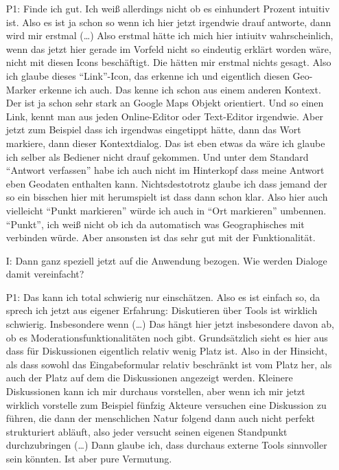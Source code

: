 \begin{itemize}
    \item[P1:] Finde ich gut. Ich wei{\ss} allerdings nicht ob es einhundert Prozent intuitiv ist. Also es ist ja schon so wenn ich hier jetzt irgendwie drauf antworte, dann wird mir erstmal (\dots) Also erstmal h{\"a}tte ich mich hier intiuitv wahrscheinlich, wenn das jetzt hier gerade im Vorfeld nicht so eindeutig erkl{\"a}rt worden w{\"a}re, nicht mit diesen Icons besch{\"a}ftigt. Die h{\"a}tten mir erstmal nichts gesagt. Also ich glaube dieses "`Link"'-Icon, das erkenne ich und eigentlich diesen Geo-Marker erkenne ich auch. Das kenne ich schon aus einem anderen Kontext. Der ist ja schon sehr stark an Google Maps Objekt orientiert. Und so einen Link, kennt man aus jeden Online-Editor oder Text-Editor irgendwie. Aber jetzt zum Beispiel dass ich irgendwas eingetippt h{\"a}tte, dann das Wort markiere, dann dieser Kontextdialog. Das ist eben etwas da w{\"a}re ich glaube ich selber als Bediener nicht drauf gekommen. Und unter dem Standard "`Antwort verfassen"' habe ich auch nicht im Hinterkopf dass meine Antwort eben Geodaten enthalten kann. Nichtsdestotrotz glaube ich dass jemand der so ein bisschen hier mit herumspielt ist dass dann schon klar. Also hier auch vielleicht "`Punkt markieren"' w{\"u}rde ich auch in "`Ort markieren"' umbennen. "`Punkt"', ich wei{\ss} nicht ob ich da automatisch was Geographisches mit verbinden w{\"u}rde. Aber ansonsten ist das sehr gut mit der Funktionalit{\"a}t.
    \item[I:] Dann ganz speziell jetzt auf die Anwendung bezogen. Wie werden Dialoge damit vereinfacht?
    \item[P1:] Das kann ich total schwierig nur einsch{\"a}tzen. Also es ist einfach so, da sprech ich jetzt aus eigener Erfahrung: Diskutieren {\"u}ber Tools ist wirklich schwierig. Insbesondere wenn (\dots) Das h{\"a}ngt hier jetzt insbesondere davon ab, ob es Moderationsfunktionalit{\"a}ten noch gibt. Grunds{\"a}tzlich sieht es hier aus dass f{\"u}r Diskussionen eigentlich relativ wenig Platz ist. Also in der Hinsicht, als dass sowohl das Eingabeformular relativ beschr{\"a}nkt ist vom Platz her, als auch der Platz auf dem die Diskussionen angezeigt werden. Kleinere Diskussionen kann ich mir durchaus vorstellen, aber wenn ich mir jetzt wirklich vorstelle zum Beispiel f{\"u}nfzig Akteure versuchen eine Diskussion zu f{\"u}hren, die dann der menschlichen Natur folgend dann auch nicht perfekt strukturiert abl{\"a}uft, also jeder versucht seinen eigenen Standpunkt durchzubringen (\dots) Dann glaube ich, dass durchaus externe Tools sinnvoller sein k{\"o}nnten. Ist aber pure Vermutung.

\end{itemize}
